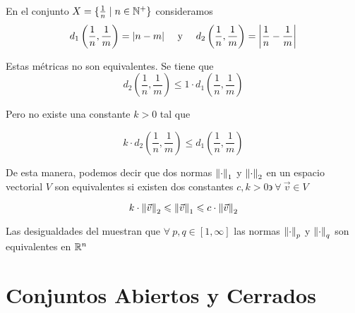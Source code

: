 \begin{eg}
    En el conjunto $X = \{ \frac{1}{n} \mid n \in \mathbb{N}^+ \}$ consideramos 
    \begin{align*}
       d_1\left( \frac{1}{n}, \frac{1}{m} \right) = \abs{n-m} && \text{ y } && d_2\left( \frac{1}{n}, \frac{1}{m} \right) = \abs{\frac{1}{n} - \frac{1}{m}}
    \end{align*}

    Estas métricas no son equivalentes. Se tiene que 
    \begin{equation*}
         d_2\left( \frac{1}{n}, \frac{1}{m} \right) \leqslant 1 \cdot  d_1\left( \frac{1}{n}, \frac{1}{m} \right)
    \end{equation*}

    Pero no existe una constante $k > 0 $ tal que

    \begin{equation*}
        k \cdot d_2\left( \frac{1}{n}, \frac{1}{m} \right) \leqslant d_1\left( \frac{1}{n}, \frac{1}{m} \right)
    \end{equation*}
\end{eg}

\begin{remark}
    De esta manera, podemos decir que dos normas ${\norm{\cdot}}_{1}$ y ${\norm{\cdot}}_{2}$ en un espacio vectorial $V$ son equivalentes si existen dos constantes $c, k > 0 \backepsilon \: \forall \: \vec{v} \in V$

    \begin{equation*}
        k \cdot {\norm{\vec{v}}}_{2} \leqslant {\norm{\vec{v}}}_{1} \leqslant c \cdot {\norm{\vec{v}}}_{2}
    \end{equation*}
\end{remark}

\begin{corollary}
    Las desigualdades del  muestran que $\forall \: p,q \in [1,\infty]$ las normas ${\norm{\cdot}}_{p}$ y ${\norm{\cdot}}_{q}$ son equivalentes en $\mathbb{R}^n$
\end{corollary}

\section{Conjuntos Abiertos y Cerrados}

